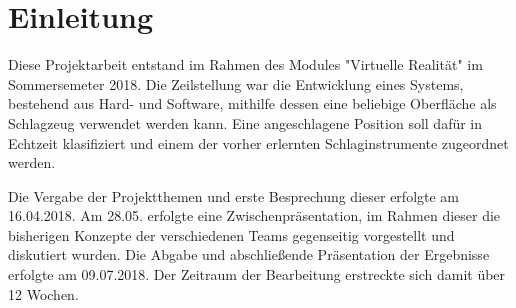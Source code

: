 \section*{Einleitung}
Diese Projektarbeit entstand im Rahmen des Modules "Virtuelle Realität" im Sommersemeter 2018. Die Zeilstellung war die Entwicklung eines Systems, bestehend aus Hard- und Software, mithilfe dessen eine beliebige Oberfläche als Schlagzeug verwendet werden kann.
Eine angeschlagene Position soll dafür in Echtzeit klasifiziert und einem der vorher erlernten Schlaginstrumente zugeordnet werden.

Die Vergabe der Projektthemen und erste Besprechung dieser erfolgte am 16.04.2018. Am 28.05. erfolgte eine Zwischenpräsentation, im Rahmen dieser die bisherigen Konzepte der verschiedenen Teams gegenseitig vorgestellt und diskutiert wurden. 
Die Abgabe und abschließende Präsentation der Ergebnisse erfolgte am 09.07.2018. 
Der Zeitraum der Bearbeitung erstreckte sich damit über 12 Wochen.


